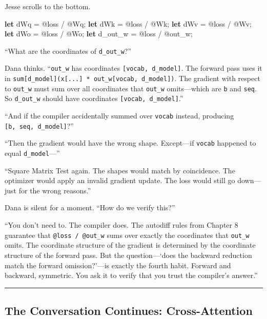 \documentclass[11pt,]{article}
\newenvironment{Shaded}{}{}
\newcommand{\KeywordTok}[1]{\textcolor[rgb]{0.00,0.44,0.13}{\textbf{#1}}}
\newcommand{\NormalTok}[1]{#1}
\begin{document}
Jesse scrolls to the bottom.

\begin{Shaded}
\begin{Highlighting}[]
\KeywordTok{let}\NormalTok{ dWq = @loss / @Wq;}
\KeywordTok{let}\NormalTok{ dWk = @loss / @Wk;}
\KeywordTok{let}\NormalTok{ dWv = @loss / @Wv;}
\KeywordTok{let}\NormalTok{ dWo = @loss / @Wo;}
\KeywordTok{let}\NormalTok{ d_out_w = @loss / @out_w;}
\end{Highlighting}
\end{Shaded}

``What are the coordinates of \texttt{d\_out\_w}?''

Dana thinks. ``\texttt{out\_w} has coordinates
\texttt{{[}vocab,\ d\_model{]}}. The forward pass uses it in
\texttt{sum{[}d\_model{]}(x{[}...{]}\ *\ out\_w{[}vocab,\ d\_model{]})}.
The gradient with respect to \texttt{out\_w} must sum over all
coordinates that \texttt{out\_w} omits---which are \texttt{b} and
\texttt{seq}. So \texttt{d\_out\_w} should have coordinates
\texttt{{[}vocab,\ d\_model{]}}.''

``And if the compiler accidentally summed over \texttt{vocab} instead,
producing \texttt{{[}b,\ seq,\ d\_model{]}}?''

``Then the gradient would have the wrong shape. Except---if
\texttt{vocab} happened to equal \texttt{d\_model}---''

``Square Matrix Test again. The shapes would match by coincidence. The
optimizer would apply an invalid gradient update. The loss would still
go down---just for the wrong reasons.''

Dana is silent for a moment. ``How do we verify this?''

``You don't need to. The compiler does. The autodiff rules from Chapter
8 guarantee that \texttt{@loss\ /\ @out\_w} sums over exactly the
coordinates that \texttt{out\_w} omits. The coordinate structure of the
gradient is determined by the coordinate structure of the forward pass.
But the question---`does the backward reduction match the forward
omission?'---is exactly the fourth habit. Forward and backward,
symmetric. You ask it to verify that you trust the compiler's answer.''

\begin{center}\rule{0.5\linewidth}{0.4pt}\end{center}

\hypertarget{the-conversation-continues-cross-attention}{%
\subsection{The Conversation Continues:
Cross-Attention}\label{the-conversation-continues-cross-attention}}
\end{document}
